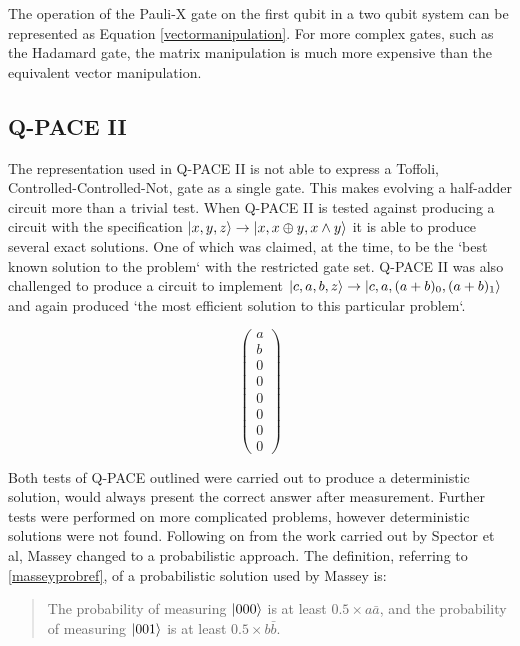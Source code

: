 \documentclass[authoryearcitations]{UoYCSproject}
\begin{document}
The operation of the Pauli-X gate on the first qubit in a two qubit system can be represented as Equation \ref{vectormanipulation}.
For more complex gates, such as the Hadamard gate, the matrix manipulation is much more expensive than the equivalent vector manipulation.

\subsection{Q-PACE II}
The representation used in Q-PACE II is not able to express a Toffoli, Controlled-Controlled-Not, gate as a single gate.
This makes evolving a half-adder circuit more than a trivial test.
When Q-PACE II is tested against producing a circuit with the specification $\left\vert{x, y, z}\right\rangle\rightarrow\left\vert{x,x \oplus y, x \wedge y}\right\rangle$ it is able to produce several exact solutions.
One of which was claimed, at the time, to be the `best known solution to the problem`\cite{masseythesis} with the restricted gate set.
Q-PACE II was also challenged to produce a circuit to implement $\left\vert{c, a, b, z}\right\rangle\rightarrow\left\vert{c, a, (a+b)_0, (a+b)_1}\right\rangle$ and again produced `the most efficient solution to this particular problem`\cite{masseythesis}.

\begin{equation}
\begin{pmatrix}
a\\
b\\
0\\
0\\
0\\
0\\
0\\
0
\end{pmatrix}
\label{masseyprobref}
\end{equation}

Both tests of Q-PACE outlined were carried out to produce a deterministic solution, would always present the correct answer after measurement.
Further tests were performed on more complicated problems, however deterministic solutions were not found.
Following on from the work carried out by Spector et al\cite{LSpectorGPforQC,LSpectorANDOR,Spector:1999:QCA:316573.317112}, Massey changed to a probabilistic approach.
The definition, referring to \ref{masseyprobref}, of a probabilistic solution used by Massey is:

\begin{quote}
The probability of measuring $\left\vert{000}\right\rangle$ is at least $0.5 \times a\bar{a}$, and the probability of measuring $\left\vert{001}\right\rangle$ is at least $0.5 \times b\bar{b}$.\cite{masseythesis}
\end{quote}
\end{document}
